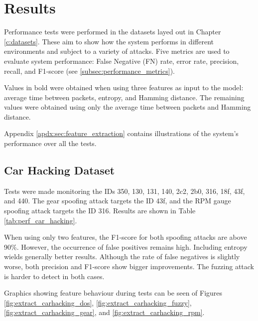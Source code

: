 \chapter{Results}
\label{c:results}

Performance tests were performed in the datasets layed out in Chapter \ref{c:datasets}. These aim to show how the system performs in different environments and subject to a variety of attacks. Five metrics are used to evaluate system performance: False Negative (FN) rate, error rate, precision, recall, and F1-score (see \ref{subsec:performance_metrics}).\par
Values in bold were obtained when using three features as input to the model: average time between packets, entropy, and Hamming distance. The remaining values were obtained using only the average time between packets and Hamming distance.\par
Appendix \ref{apdx:sec:feature_extraction} contains illustrations of the system's performance over all the tests.

\section{Car Hacking Dataset}

Tests were made monitoring the IDs 350, 130, 131, 140, 2c2, 2b0, 316, 18f, 43f, and 440. The gear spoofing attack targets the ID 43f, and the RPM gauge spoofing attack targets the ID 316. Results are shown in Table \ref{tab:perf_car_hacking}.\par
When using only two features, the F1-score for both spoofing attacks are above 90\%. However, the occurrence of false positives remains high. Including entropy wields generally better results. Although the rate of false negatives is slightly worse, both precision and F1-score show bigger improvements. The fuzzing attack is harder to detect in both cases.\par
Graphics showing feature behaviour during tests can be seen of Figures \ref{fig:extract_carhacking_dos}, \ref{fig:extract_carhacking_fuzzy}, \ref{fig:extract_carhacking_gear}, and \ref{fig:extract_carhacking_rpm}.

